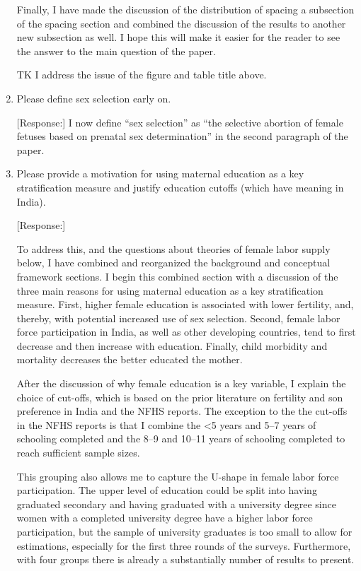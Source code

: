 \documentclass[letterpaper,12pt]{article}
\begin{document}
\begin{enumerate}
Finally, I have made the discussion of the distribution of spacing a subsection
of the spacing section and combined the discussion of the results to another new 
subsection as well.
I hope this will make it easier for the reader to see the answer to the main
question of the paper.

TK I address the issue of the figure and table title above.



\item Please define sex selection early on.

[Response:] I now define ``sex selection'' as ``the selective abortion of female fetuses 
based on prenatal sex determination'' in the second paragraph of the paper.


\item Please provide a motivation for using maternal education as a key
stratification measure and justify education cutoffs (which have meaning
in India).

[Response:] 

To address this, and the questions about theories of female labor supply below, I have
combined and reorganized the background and conceptual framework sections.
I begin this combined section with a discussion of the three main reasons for using 
maternal education as a key stratification measure.
First, higher female education is associated with lower fertility, and, thereby, with
potential increased use of sex selection.
Second, female labor force participation in India, as well as other developing countries, 
tend to first decrease and then increase with education.
Finally, child morbidity and mortality decreases the better educated the mother.

After the discussion of why female education is a key variable, I explain the choice
of cut-offs, which is based on the prior literature on fertility and son preference in 
India and the NFHS reports.
The exception to the the cut-offs in the NFHS reports is that I combine
the <5 years and 5--7 years of schooling completed and 
the 8--9 and 10--11 years of schooling completed to reach sufficient sample sizes.

This grouping also allows me to capture the U-shape in female labor force participation.
The upper level of education could be split into having graduated secondary and having 
graduated with a university degree since women with a completed university degree have 
a higher labor force participation, but the sample of university graduates is too small 
to allow for estimations, especially for the first three rounds of the surveys.
Furthermore, with four groups there is already a substantially number of results to 
present.



\end{enumerate}
\end{document}
